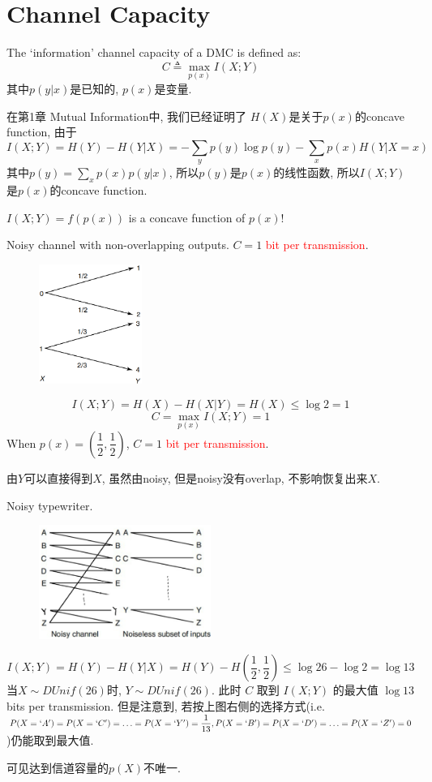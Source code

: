 \section{Channel Capacity}

The `information' channel capacity of a DMC is defined as:
$$C\triangleq \max\limits_{p(x)}I(X;Y)$$
其中$p(y|x)$是已知的, $p(x)$是变量.

在第1章 Mutual Information中, 我们已经证明了 $H(X)$是关于$p(x)$的concave function, 由于
$$I(X;Y)=H(Y)-H(Y|X)=-\sum\limits_{y}p(y)\log p(y)-\sum_{x}p(x)H(Y|X=x)$$
其中$p(y)=\sum\limits_{x}p(x)p(y|x)$, 所以$p(y)$是$p(x)$的线性函数, 所以$I(X;Y)$是$p(x)$的concave function.

$I(X;Y)=f\left(p(x)\right)$ is a concave function of $p(x)$!

\begin{example}
Noisy channel with non-overlapping outputs. $C=1$ \textcolor{red}{bit per transmission}.
\begin{figure}[htbp]
    \centering
    \includegraphics[width=0.3\textwidth]{./figures/chapter5/non_overlap.png}
\end{figure}
$$I(X;Y)=H(X)-H(X|Y)=H(X)\leq \log 2 =1$$
$$C=\max_{p(x)}I(X;Y)=1$$
When $p(x)=\left(\dfrac{1}{2},\dfrac{1}{2}\right)$, $C=1$ \textcolor{red}{bit per transmission}.

由$Y$可以直接得到$X$, 虽然由noisy, 但是noisy没有overlap, 不影响恢复出来$X$.
\end{example}

\begin{example}
Noisy typewriter.
\begin{figure}[htbp]
    \centering
    \includegraphics[width=0.5\textwidth]{./figures/chapter5/noisy_typewriter.png}
\end{figure}
$$I(X;Y)=H(Y)-H(Y|X)=H(Y)-H\left(\dfrac{1}{2},\dfrac{1}{2}\right)\leq \log 26 - \log 2 = \log 13$$
当$X\sim DUnif(26)$时, $Y\sim DUnif(26)$. 此时 $C$ 取到 $I(X;Y)$ 的最大值 $\log 13$ bits per transmission.
但是注意到, 若按上图右侧的选择方式(i.e. $P(X=`A')=P(X=`C')=\ldots=P(X=`Y')=\dfrac{1}{13},P(X=`B')=P(X=`D')=\ldots=P(X=`Z')=0$)仍能取到最大值.

可见达到信道容量的$p(X)$不唯一.
\end{example}

